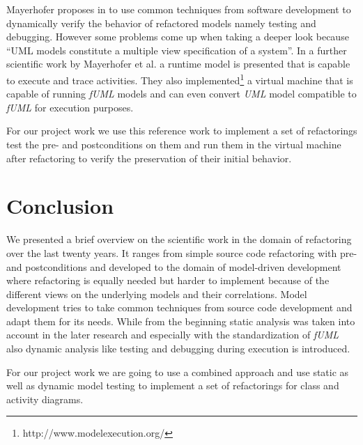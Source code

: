 \documentclass{llncs}
\begin{document}
Mayerhofer proposes in \cite{DBLP:conf/icse/Mayerhofer12} to use common techniques from software development to dynamically verify the behavior of refactored models namely testing and debugging. However some problems come up when taking a deeper look because ``UML models constitute a multiple view specification of a system''. In a further scientific work by Mayerhofer et al. \cite{DBLP:conf/models/MayerhoferLK12} a runtime model is presented that is capable to execute and trace activities. They also implemented\footnote{http://www.modelexecution.org/} a virtual machine that is capable of running \textit{fUML} models and can even convert \textit{UML} model compatible to \textit{fUML} for execution purposes.

For our project work we use this reference work to implement a set of refactorings test the pre- and postconditions on them and run them in the virtual machine after refactoring to verify the preservation of their initial behavior.

\section{Conclusion}
\label{sec:conclusion}

We presented a brief overview on the scientific work in the domain of refactoring over the last twenty years. It ranges from simple source code refactoring with pre- and postconditions and developed to the domain of model-driven development where refactoring is equally needed but harder to implement because of the different views on the underlying models and their correlations. Model development tries to take common techniques from source code development and adapt them for its needs. While from the beginning static analysis was taken into account in the later research and especially with the standardization of \textit{fUML} also dynamic analysis like testing and debugging during execution is introduced.

For our project work we are going to use a combined approach and use static as well as dynamic model testing to implement a set of refactorings for class and activity diagrams.

\newpage


\end{document}
